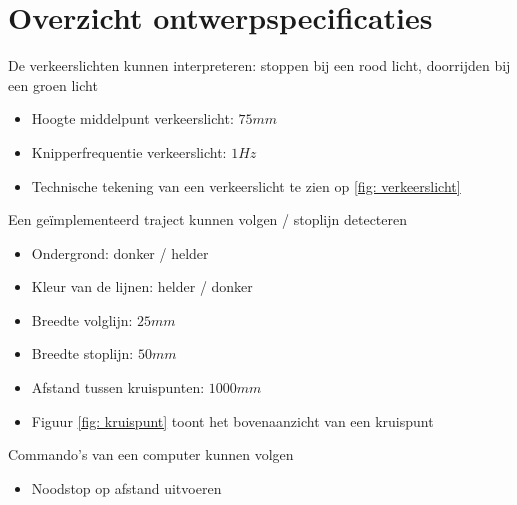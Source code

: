 \documentclass[12pt]{article}
\begin{document}



\section*{Overzicht ontwerpspecificaties}
De verkeerslichten kunnen interpreteren: stoppen bij een rood licht, doorrijden bij een groen licht

\begin{itemize}
\item Hoogte middelpunt verkeerslicht: $75mm$
\item Knipperfrequentie verkeerslicht: $1Hz$
\item Technische tekening van een verkeerslicht te zien op  \ref{fig: verkeerslicht}
\end{itemize}
\bigskip



Een geïmplementeerd traject kunnen volgen / stoplijn detecteren

\begin{itemize}
\item Ondergrond: donker / helder
\item Kleur van de lijnen: helder / donker 
\item Breedte volglijn: $25mm$
\item Breedte stoplijn: $50mm$
\item Afstand tussen kruispunten: $1000mm$
\item Figuur \ref{fig: kruispunt} toont het bovenaanzicht van een kruispunt
\end{itemize}
\bigskip


Commando's van een computer kunnen volgen

\begin{itemize}
\item Noodstop op afstand uitvoeren
\end{itemize}

\bigskip
\end{document}
